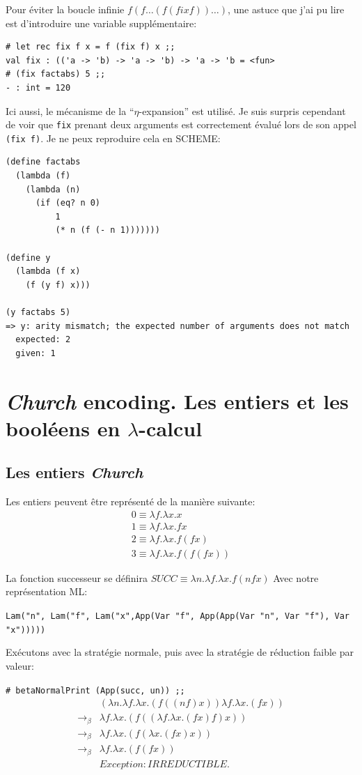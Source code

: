\documentclass[11pt]{book}
\begin{document}
Pour éviter la boucle infinie $f(f\ldots(f (fix f))\ldots)$, 
une astuce que j'ai pu lire est d'introduire une variable supplémentaire:

\begin{Verbatim}
# let rec fix f x = f (fix f) x ;;
val fix : (('a -> 'b) -> 'a -> 'b) -> 'a -> 'b = <fun>
# (fix factabs) 5 ;;
- : int = 120
\end{Verbatim}
Ici aussi, le mécanisme de la ``$\eta$-expansion'' est utilisé.
Je suis surpris cependant de voir que \verb+fix+ prenant deux arguments est correctement évalué lors de son appel \verb+(fix f)+.
Je ne peux reproduire cela en SCHEME:

\begin{Verbatim}
(define factabs
  (lambda (f)
    (lambda (n)
      (if (eq? n 0)
          1
          (* n (f (- n 1)))))))

(define y
  (lambda (f x)
    (f (y f) x)))

(y factabs 5)
=> y: arity mismatch; the expected number of arguments does not match 
  expected: 2
  given: 1
\end{Verbatim}

\section{\textit{Church} encoding. Les entiers et les booléens en $\lambda$-calcul}
\subsection{Les entiers \textit{Church} }
Les entiers peuvent être représenté de la manière suivante:
$$
\begin{array}{l}
0 \equiv \lambda f.\lambda x.x \\
1 \equiv \lambda f.\lambda x.f x \\
2 \equiv \lambda f.\lambda x.f (f x) \\
3 \equiv \lambda f.\lambda x.f (f (f x)) 
\end{array}
$$

La fonction successeur se définira $SUCC \equiv \lambda n.\lambda f.\lambda x.f (n f x)$
Avec notre représentation ML: 

\verb+Lam("n", Lam("f", Lam("x",App(Var "f", App(App(Var "n", Var "f"), Var "x")))))+

Exécutons avec la stratégie normale, puis avec la stratégie de réduction faible par valeur:


\verb+# betaNormalPrint (App(succ, un)) ;;+
$$
\begin{array}{ll}
& (\lambda n . \lambda f . \lambda x . (f((nf)x))\lambda f . \lambda x . (fx))   \\
\rightarrow _\beta & \lambda f . \lambda x . (f((\lambda f . \lambda x . (fx)f)x))   \\
\rightarrow _\beta & \lambda f . \lambda x . (f(\lambda x . (fx)x))   \\
\rightarrow _\beta & \lambda f . \lambda x . (f(fx))   \\
& Exception: IRREDUCTIBLE.
\end{array}
$$
\end{document}
